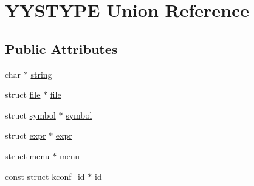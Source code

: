 \hypertarget{unionYYSTYPE}{\section{Y\-Y\-S\-T\-Y\-P\-E Union Reference}
\label{unionYYSTYPE}
}
\subsection*{Public Attributes}
\begin{DoxyCompactItemize}
\item 
char $\ast$ \hyperlink{unionYYSTYPE_ae8767f4b426d2a2575573f567e8a142b}{string}
\item 
struct \hyperlink{structfile}{file} $\ast$ \hyperlink{unionYYSTYPE_a8bae8ffa75c8b07b528c4fe5de2401b4}{file}
\item 
struct \hyperlink{structsymbol}{symbol} $\ast$ \hyperlink{unionYYSTYPE_a72913aac271333edb4f145ef15fc1779}{symbol}
\item 
struct \hyperlink{structexpr}{expr} $\ast$ \hyperlink{unionYYSTYPE_a1c6524a101e4f9210f47379f7a2ecda0}{expr}
\item 
struct \hyperlink{structmenu}{menu} $\ast$ \hyperlink{unionYYSTYPE_a89d39a530f417ec6fdf6bf0ed149e249}{menu}
\item 
const struct \hyperlink{structkconf__id}{kconf\-\_\-id} $\ast$ \hyperlink{unionYYSTYPE_a0f17c44301ab57aaa56b1028c0d97ee5}{id}
\end{DoxyCompactItemize}


